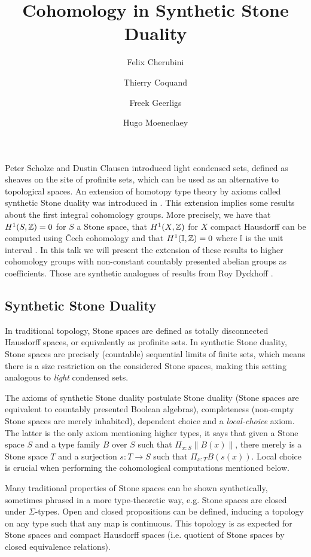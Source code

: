 \documentclass{../util/zariski}
\author{
Felix Cherubini %
\and 
 Thierry Coquand%
\and 
 Freek Geerligs%
\and
 Hugo Moeneclaey %
}
\title{Cohomology in Synthetic Stone Duality}
\begin{document}
\maketitle
Peter Scholze and Dustin Clausen \cite{Scholze} introduced light condensed sets, defined as sheaves on the site of profinite sets, which can be used as an alternative to topological spaces. 
An extension of homotopy type theory by axioms called synthetic Stone duality was introduced in \cite{synthetic-stone-duality}. This extension implies some results about the first integral cohomology groups. More precisely, we have that $H^1(S,\mathbb{Z}) = 0$ for $S$ a Stone space, that $H^1(X,\mathbb{Z})$ for $X$ compact Hausdorff can be computed using \v{C}ech cohomology and that $H^1(\mathbb{I},\mathbb{Z}) = 0$ where $\mathbb{I}$ is the unit interval \cite{synthetic-stone-duality}. In this talk we will present the extension of these results to higher cohomology groups with non-constant countably presented abelian groups as coefficients. Those are synthetic analogues of results from Roy Dyckhoff \cite{dyckhoff76,dyckhoff76-1}.

\subsection*{Synthetic Stone Duality}

In traditional topology, Stone spaces are defined as totally disconnected Hausdorff spaces, or equivalently as profinite sets. In synthetic Stone duality, Stone spaces are precisely (countable) sequential limits of finite sets, which means there is a size restriction on the considered Stone spaces, making this setting analogous to \emph{light} condensed sets. 

The axioms of synthetic Stone duality postulate Stone duality (Stone spaces are equivalent to countably presented Boolean algebras), completeness (non-empty Stone spaces are merely inhabited), dependent choice and a \emph{local-choice} axiom. The latter is the only axiom mentioning higher types, it says that given a Stone space $S$ and a type family $B$ over $S$ such that $\Pi_{x:S} \| B(x)  \|$, there merely is a Stone space $T$ and a surjection $s:T\to S$ such that $\Pi_{x:T} B(s(x))$. Local choice is crucial when performing the cohomological computations mentioned below.

Many traditional properties of Stone spaces can be shown synthetically, sometimes phrased in a more type-theoretic way, e.g. Stone spaces are closed under $\Sigma$-types. Open and closed propositions can be defined, inducing a topology on any type such that any map is continuous. This topology is as expected for Stone spaces and compact Hausdorff spaces (i.e. quotient of Stone spaces by closed equivalence relations).
\end{document}
